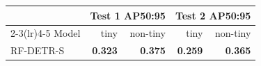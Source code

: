 \begin{tabular}{lrrrr}
\toprule
 & \multicolumn{2}{c}{Test 1 AP50:95} & \multicolumn{2}{c}{Test 2 AP50:95} \\
\cmidrule(lr){2-3}\cmidrule(lr){4-5}
Model & tiny & non-tiny & tiny & non-tiny \\
\midrule
RF-DETR-S & \textbf{0.323} & \textbf{0.375} & \textbf{0.259} & \textbf{0.365} \\
\bottomrule
\end{tabular}
